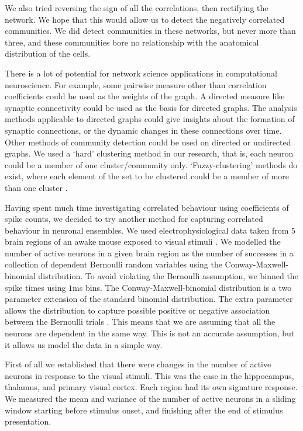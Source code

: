 We also tried reversing the sign of all the correlations, then rectifying the network. We hope that this would allow us to detect the negatively correlated communities. We did detect communities in these networks, but never more than three, and these communities bore no relationship with the anatomical distribution of the cells.

There is a lot of potential for network science applications in computational neuroscience. For example, some pairwise measure other than correlation coefficients could be used as the weights of the graph. A directed measure like synaptic connectivity could be used as the basis for directed graphs. The analysis methods applicable to directed graphs could give insights about the formation of synaptic connections, or the dynamic changes in these connections over time. Other methods of community detection could be used on directed or undirected graphs. We used a `hard' clustering method in our research, that is, each neuron could be a member of one cluster/community only. `Fuzzy-clustering' methods do exist, where each element of the set to be clustered could be a member of more than one cluster \parencite{baadel}.

Having spent much time investigating correlated behaviour using coefficients of spike counts, we decided to try another method for capturing correlated behaviour in neuronal ensembles. We used electrophysiological data taken from $5$ brain regions of an awake mouse exposed to visual stimuli \parencite{steinmetz2019}. We modelled the number of active neurons in a given brain region as the number of successes in a collection of dependent Bernoulli random variables using the Conway-Maxwell-binomial distribution. To avoid violating the Bernoulli assumption, we binned the spike times using $1$ms bins. The Conway-Maxwell-binomial distribution is a two parameter extension of the standard binomial distribution. The extra parameter allows the distribution to capture possible positive or negative association between the Bernoulli trials \parencite{kadane_2016}. This means that we are assuming that all the neurons are dependent in the same way. This is not an accurate assumption, but it allows us model the data in a simple way.

First of all we established that there were changes in the number of active neurons in response to the visual stimuli. This was the case in the hippocampus, thalamus, and primary visual cortex. Each region had its own signature response. We measured the mean and variance of the number of active neurons in a sliding window starting before stimulus onset, and finishing after the end of stimulus presentation.

